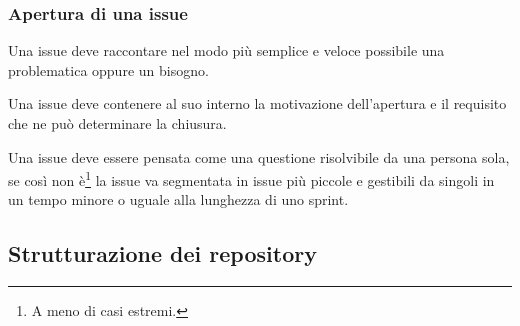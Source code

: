 \subsubsection{Apertura di una issue}\label{sss:issue}

Una issue deve raccontare nel modo più semplice e veloce possibile una problematica oppure un bisogno.

Una issue deve contenere al suo interno la motivazione dell'apertura e il requisito che ne può determinare la chiusura.

Una issue deve essere pensata come una questione risolvibile da una persona sola, se così non è\footnote{A meno di casi estremi.} la issue va segmentata in issue più piccole e gestibili da singoli in un tempo minore o uguale alla lunghezza di uno sprint.


\subsection{Strutturazione dei repository}
